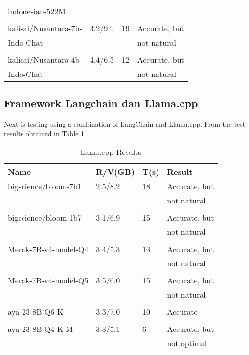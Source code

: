 \begin{table}[!htbp]
\begin{tabular}{llll}
    indonesian-522M \cite{cahya_llm}          &          &           &  \\
    \\
    kalisai/Nusantara-7b-     & 3.2/9.9   &19    & Accurate, but \\
    Indo-Chat \cite{zulfikar_aji_kusworo_2024}        &          &           & not natural \\
    \\
    kalisai/Nusantara-4b-     & 4.4/6.3   &12    & Accurate, but \\
    Indo-Chat  \cite{zulfikar_aji_kusworo_2024}               &          &           & not natural \\
    \bottomrule
  \end{tabular}
\end{table}


\subsection{Framework Langchain dan Llama.cpp}
Next is testing using a combination of LangChain and Llama.cpp. From the test results obtained in Table \ref{tab:hasilllama}
\begin{table}[!htbp]
  \caption{llama.cpp Results}
  \label{tab:hasilllama}
  \centering
  \begin{tabular}{llll}
    \toprule
    Name                      & R/V(GB) & T(s)  & Result \\
    \midrule
    bigscience/bloom-7b1      & 2.5/8.2    &18   & Accurate, but \\ \cite{muennighoff2022crosslingual}                          &          &           & not natural \\  
    \\
    bigscience/bloom-1b7
    \cite{muennighoff2022crosslingual}      & 3.1/6.9   &15    & Accurate, but \\
                              &          &           & not natural \\ 
    \\ 
    Merak-7B-v4-model-Q4 \cite{Merak}       & 3.4/5.3    &13   & Accurate, but \\
                              &          &           & not natural \\
    \\
    Merak-7B-v4-model-Q5 \cite{Merak}       & 3.5/6.0   &15    & Accurate, but \\
                              &          &           & not natural \\
    \\
    aya-23-8B-Q6-K \cite{aryabumi2024aya}   & 3.3/7.0  &10     & Accurate \\
    \\
    aya-23-8B-Q4-K-M \cite{aryabumi2024aya} & 3.3/5.1   &6      & Accurate, but \\
                              &          &           & not optimal \\
    \bottomrule
  \end{tabular}
\end{table}

